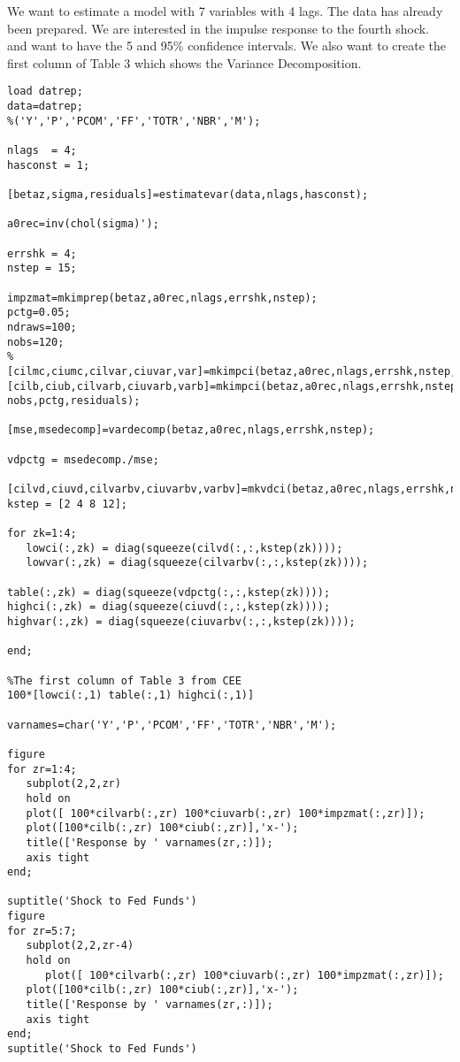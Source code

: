 \documentclass{article}
\begin{document}
We want to estimate a model with 7 variables with 4 lags. The data has
already been prepared. We are interested in the impulse response to the
fourth shock. and want to have the 5 and 95\% confidence intervals. We also
want to create the first column of Table 3 which shows the Variance
Decomposition.
\begin{verbatim}
load datrep;
data=datrep;
%('Y','P','PCOM','FF','TOTR','NBR','M');
 
nlags  = 4;
hasconst = 1;
 
[betaz,sigma,residuals]=estimatevar(data,nlags,hasconst);
 
a0rec=inv(chol(sigma)');
 
errshk = 4;
nstep = 15;
 
impzmat=mkimprep(betaz,a0rec,nlags,errshk,nstep);
pctg=0.05;
ndraws=100;
nobs=120;
%[cilmc,ciumc,cilvar,ciuvar,var]=mkimpci(betaz,a0rec,nlags,errshk,nstep,ndraws,nobs,pctg);
[cilb,ciub,cilvarb,ciuvarb,varb]=mkimpci(betaz,a0rec,nlags,errshk,nstep,ndraws,...
nobs,pctg,residuals);
 
[mse,msedecomp]=vardecomp(betaz,a0rec,nlags,errshk,nstep);
 
vdpctg = msedecomp./mse;
 
[cilvd,ciuvd,cilvarbv,ciuvarbv,varbv]=mkvdci(betaz,a0rec,nlags,errshk,nstep,ndraws,nobs,pctg,residuals);
kstep = [2 4 8 12];
 
for zk=1:4;
   lowci(:,zk) = diag(squeeze(cilvd(:,:,kstep(zk))));
   lowvar(:,zk) = diag(squeeze(cilvarbv(:,:,kstep(zk))));
 
table(:,zk) = diag(squeeze(vdpctg(:,:,kstep(zk))));
highci(:,zk) = diag(squeeze(ciuvd(:,:,kstep(zk))));
highvar(:,zk) = diag(squeeze(ciuvarbv(:,:,kstep(zk))));
 
end;
 
%The first column of Table 3 from CEE
100*[lowci(:,1) table(:,1) highci(:,1)]
 
varnames=char('Y','P','PCOM','FF','TOTR','NBR','M');
 
figure
for zr=1:4;
   subplot(2,2,zr)
   hold on
   plot([ 100*cilvarb(:,zr) 100*ciuvarb(:,zr) 100*impzmat(:,zr)]);
   plot([100*cilb(:,zr) 100*ciub(:,zr)],'x-');
   title(['Response by ' varnames(zr,:)]);
   axis tight
end;
 
suptitle('Shock to Fed Funds')
figure
for zr=5:7;
   subplot(2,2,zr-4)
   hold on
      plot([ 100*cilvarb(:,zr) 100*ciuvarb(:,zr) 100*impzmat(:,zr)]);
   plot([100*cilb(:,zr) 100*ciub(:,zr)],'x-');
   title(['Response by ' varnames(zr,:)]);
   axis tight
end;
suptitle('Shock to Fed Funds')
 
\end{verbatim}
\end{document}
